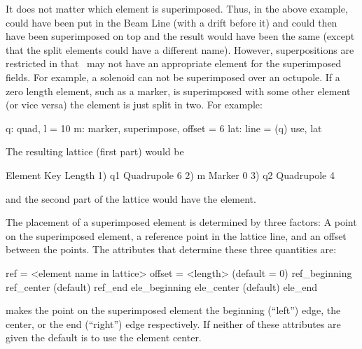 It does not matter which element is superimposed. Thus, in the above
example,  could have been put in the Beam Line (with a drift
before it) and  could then have been superimposed on top and the
result would have been the same (except that the split elements could
have a different name). However, superpositions are restricted in that
\bmad\ may not have an appropriate element for the superimposed
fields. For example, a solenoid can not be superimposed over an
octupole.  If a zero length element, such as a marker, is superimposed
with some other element (or vice versa) the element is just split in
two. For example:
\begin{example}
  q: quad, l = 10
  m: marker, superimpose, offset = 6
  lat: line = (q)
  use, lat
\end{example}
The resulting lattice (first part) would be
\begin{example}
        Element   Key           Length
  1)    q{\B}1       Quadrupole    6
  2)    m         Marker        0
  3)    q{\B}2       Quadrupole    4
\end{example}
and the second part of the lattice would have the  element.
 
The placement of a superimposed element is determined by three
factors: A point on the superimposed element, a reference point in the
lattice line, and an offset between the points. The attributes that
determine these three quantities are:
\begin{example}
  ref = <element name in lattice>
  offset = <length>      (default = 0)
  ref_beginning
  ref_center             (default)
  ref_end
  ele_beginning
  ele_center             (default)
  ele_end
\end{example}
   makes the point on the
superimposed element the beginning (``left'') edge, the center, or the
end (``right'') edge respectively. If neither of these attributes are
given the default is to use the element center.


